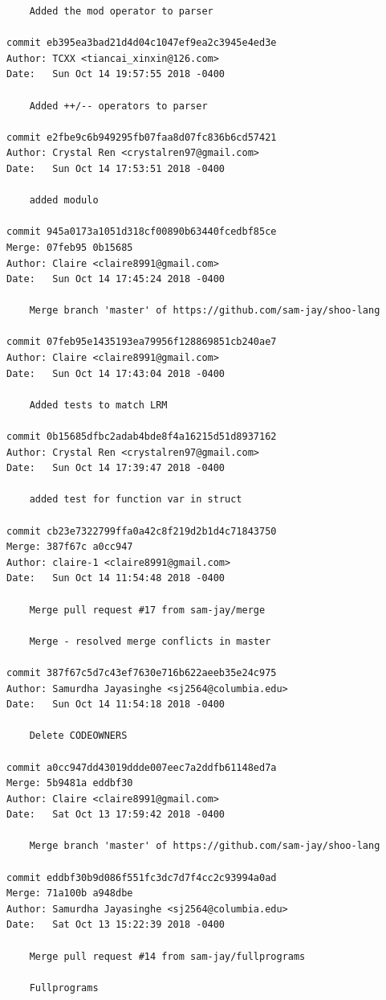 \documentclass[12pt]{article}
\begin{document}
\begin{lstlisting}
    Added the mod operator to parser

commit eb395ea3bad21d4d04c1047ef9ea2c3945e4ed3e
Author: TCXX <tiancai_xinxin@126.com>
Date:   Sun Oct 14 19:57:55 2018 -0400

    Added ++/-- operators to parser

commit e2fbe9c6b949295fb07faa8d07fc836b6cd57421
Author: Crystal Ren <crystalren97@gmail.com>
Date:   Sun Oct 14 17:53:51 2018 -0400

    added modulo

commit 945a0173a1051d318cf00890b63440fcedbf85ce
Merge: 07feb95 0b15685
Author: Claire <claire8991@gmail.com>
Date:   Sun Oct 14 17:45:24 2018 -0400

    Merge branch 'master' of https://github.com/sam-jay/shoo-lang

commit 07feb95e1435193ea79956f128869851cb240ae7
Author: Claire <claire8991@gmail.com>
Date:   Sun Oct 14 17:43:04 2018 -0400

    Added tests to match LRM

commit 0b15685dfbc2adab4bde8f4a16215d51d8937162
Author: Crystal Ren <crystalren97@gmail.com>
Date:   Sun Oct 14 17:39:47 2018 -0400

    added test for function var in struct

commit cb23e7322799ffa0a42c8f219d2b1d4c71843750
Merge: 387f67c a0cc947
Author: claire-1 <claire8991@gmail.com>
Date:   Sun Oct 14 11:54:48 2018 -0400

    Merge pull request #17 from sam-jay/merge
    
    Merge - resolved merge conflicts in master

commit 387f67c5d7c43ef7630e716b622aeeb35e24c975
Author: Samurdha Jayasinghe <sj2564@columbia.edu>
Date:   Sun Oct 14 11:54:18 2018 -0400

    Delete CODEOWNERS

commit a0cc947dd43019ddde007eec7a2ddfb61148ed7a
Merge: 5b9481a eddbf30
Author: Claire <claire8991@gmail.com>
Date:   Sat Oct 13 17:59:42 2018 -0400

    Merge branch 'master' of https://github.com/sam-jay/shoo-lang

commit eddbf30b9d086f551fc3dc7d7f4cc2c93994a0ad
Merge: 71a100b a948dbe
Author: Samurdha Jayasinghe <sj2564@columbia.edu>
Date:   Sat Oct 13 15:22:39 2018 -0400

    Merge pull request #14 from sam-jay/fullprograms
    
    Fullprograms


\end{lstlisting}
\end{document}
